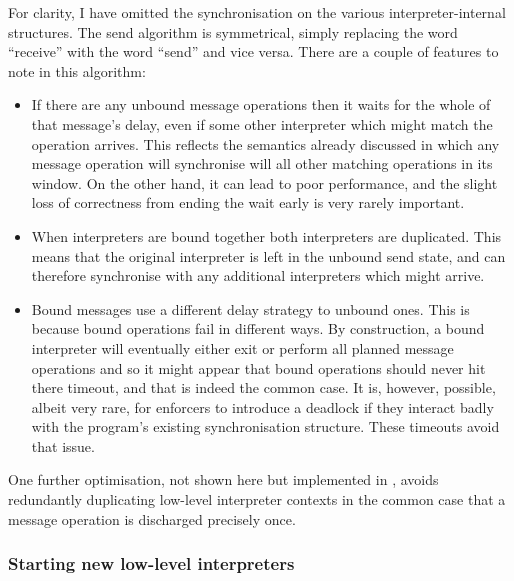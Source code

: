 For clarity, I have omitted the synchronisation on the various
interpreter-internal structures.  The send algorithm is symmetrical,
simply replacing the word ``receive'' with the word ``send'' and vice
versa.  There are a couple of features to note in this algorithm:

\begin{itemize}
\item
  If there are any unbound message operations then it waits for the
  whole of that message's delay, even if some other interpreter which
  might match the operation arrives.  This reflects the semantics
  already discussed in which any message operation will synchronise
  will all other matching operations in its window.  On the other
  hand, it can lead to poor performance, and the slight loss of
  correctness from ending the wait early is very rarely important.
\item
  When interpreters are bound together both interpreters are
  duplicated.  This means that the original interpreter is left in the
  unbound send state, and can therefore synchronise with any
  additional interpreters which might arrive.
\item
  Bound messages use a different delay strategy to unbound ones.  This
  is because bound operations fail in different ways.  By
  construction, a bound interpreter will eventually either exit or
  perform all planned message operations and so it might appear that
  bound operations should never hit there timeout, and that is indeed
  the common case.  It is, however, possible, albeit very rare, for
  {\technique} enforcers to introduce a deadlock if they interact
  badly with the program's existing synchronisation structure.  These
  timeouts avoid that issue.  
\end{itemize}

One further optimisation, not shown here but implemented in
{\implementation}, avoids redundantly duplicating low-level
interpreter contexts in the common case that a message operation is
discharged precisely once.


\subsubsection{Starting new low-level interpreters}

